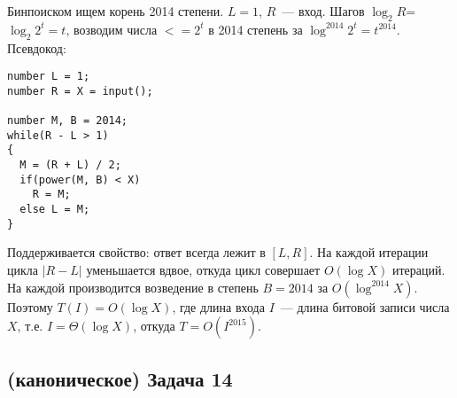 \documentclass[a4paper]{article}
\begin{document}
Бинпоиском ищем корень 2014 степени. $L=1$, $R$~--- вход. Шагов $\log_{2} R$=$\log_2 2^t=t$, возводим числа $<= 2^t$ в 2014 степень за $\log^{2014} 2^t=t^{2014}$. Псевдокод:\newline
\begin{lstlisting}
number L = 1;
number R = X = input();

number M, B = 2014;
while(R - L > 1)
{
  M = (R + L) / 2;
  if(power(M, B) < X)
    R = M;
  else L = M;
}
\end{lstlisting}
Поддерживается свойство: ответ всегда лежит в $[L,R]$. На каждой итерации цикла $|R-L|$ уменьшается вдвое, откуда цикл совершает $O(\log X)$ итераций. На каждой производится возведение в степень $B=2014$ за $O(\log^{2014} X)$. Поэтому $T(I)=O(\log X)$, где длина входа $I$~--- длина битовой записи числа $X$, т.е. $I=\Theta(\log X)$, откуда $T=O(I^{2015})$.
\subsection*{(каноническое) Задача 14}
\end{document}
